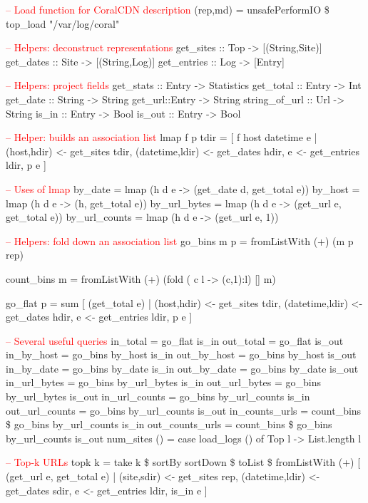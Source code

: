 \begin{code}

\textcolor{red}{-- Load function for CoralCDN description}
(rep,md) = unsafePerformIO \$ top\_load "/var/log/coral"

\textcolor{red}{-- Helpers: deconstruct representations }
get\_sites :: Top -> [(String,Site)]
get\_dates :: Site -> [(String,Log)]
get\_entries :: Log -> [Entry]

\textcolor{red}{-- Helpers: project fields }
get\_stats :: Entry -> Statistics
get\_total :: Entry -> Int
get\_date :: String -> String 
get\_url::Entry -> String
string\_of\_url :: Url -> String
is\_in :: Entry -> Bool
is\_out :: Entry -> Bool

\textcolor{red}{-- Helper: builds an association list }
lmap f p tdir = 
   [ f host datetime e | (host,hdir) <- get\_sites tdir,
                         (datetime,ldir) <- get\_dates hdir,
                          e <- get\_entries ldir,
                          p e ]

\textcolor{red}{-- Uses of lmap}
by\_date = lmap ({}h d e -> (get\_date d, get\_total e))
by\_host = lmap ({}h d e -> (h, get\_total e))
by\_url\_bytes = lmap ({}h d e -> (get\_url e, get\_total e))
by\_url\_counts = lmap ({}h d e -> (get\_url e, 1))


\textcolor{red}{-- Helpers: fold down an association list}
go\_bins m p = fromListWith (+) (m p rep)

count\_bins m = fromListWith (+) (fold ({} c l -> (c,1):l) [] m)

go\_flat p = 
  sum [ (get\_total e) | (host,hdir) <- get\_sites tdir,
                        (datetime,ldir) <- get\_dates hdir,
                        e <- get\_entries ldir,
                        p e ]

\textcolor{red}{-- Several useful queries }
in\_total = go\_flat is\_in
out\_total = go\_flat is\_out
in\_by\_host = go\_bins by\_host is\_in
out\_by\_host = go\_bins by\_host is\_out 
in\_by\_date = go\_bins by\_date is\_in 
out\_by\_date = go\_bins by\_date is\_out
in\_url\_bytes = go\_bins by\_url\_bytes is\_in
out\_url\_bytes = go\_bins by\_url\_bytes is\_out
in\_url\_counts = go\_bins by\_url\_counts is\_in
out\_url\_counts = go\_bins by\_url\_counts is\_out
in\_counts\_urls = count\_bins \$ go\_bins by\_url\_counts is\_in
out\_counts\_urls = count\_bins \$ go\_bins by\_url\_counts is\_out
num\_sites () = case load\_logs () of Top l -> List.length l

\textcolor{red}{-- Top-k URLs } 
topk k = 
  take k \$ sortBy sortDown \$ toList \$
  fromListWith (+)
    [ (get\_url e, get\_total e)
    | (site,sdir) <- get\_sites rep,
      (datetime,ldir) <- get\_dates sdir,
      e <- get\_entries ldir,
      is\_in e ]
\end{code}
\vfill{}